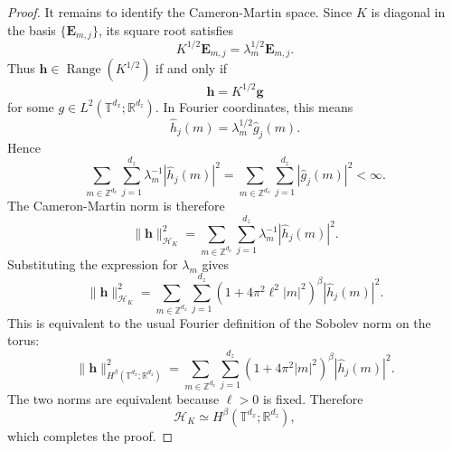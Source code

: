 \documentclass[11pt]{article}
\begin{document}
\begin{proof}
It remains to identify the Cameron-Martin space. Since $K$ is diagonal in the basis $\{\mathbf E_{m,j}\}$, its square root satisfies
\[
    K^{1/2}\mathbf E_{m,j}=\lambda_m^{1/2}\mathbf E_{m,j}.
\]
Thus $\mathbf h\in\operatorname{Range}(K^{1/2})$ if and only if
\[
    \mathbf h=K^{1/2}\mathbf g
\]
for some $g\in L^2(\mathbb T^{d_x};\mathbb R^{d_z})$. In Fourier coordinates, this means
\[
    \widehat h_j(m)
    =
    \lambda_m^{1/2}\widehat g_j(m).
\]
Hence
\[
    \sum_{m\in\mathbb Z^{d_x}}\sum_{j=1}^{d_z}
    \lambda_m^{-1}|\widehat h_j(m)|^2
    =
    \sum_{m\in\mathbb Z^{d_x}}\sum_{j=1}^{d_z}
    |\widehat g_j(m)|^2
    <\infty.
\]
The Cameron-Martin norm is therefore
\[
    \|\mathbf h\|_{\mathcal H_K}^2=\sum_{m\in\mathbb Z^{d_x}}\sum_{j=1}^{d_z}
    \lambda_m^{-1}|\widehat h_j(m)|^2.
\]
Substituting the expression for $\lambda_m$ gives
\[
    \|\mathbf h\|_{\mathcal H_K}^2=\sum_{m\in\mathbb Z^{d_x}}\sum_{j=1}^{d_z}
    \left(1+4\pi^2\ell^2|m|^2\right)^\beta
    |\widehat h_j(m)|^2.
\]
This is equivalent to the usual Fourier definition of the Sobolev norm on the torus:
\[
    \|\mathbf h\|_{H^\beta(\mathbb T^{d_x};\mathbb R^{d_z})}^2
    =\sum_{m\in\mathbb Z^{d_x}}\sum_{j=1}^{d_z}
    \left(1+4\pi^2|m|^2\right)^\beta|\widehat h_j(m)|^2.
\]
The two norms are equivalent because $\ell>0$ is fixed. Therefore
\[
    \mathcal H_K
    \simeq
    H^\beta(\mathbb T^{d_x};\mathbb R^{d_z}),
\]
which completes the proof.
\end{proof}
\end{document}
